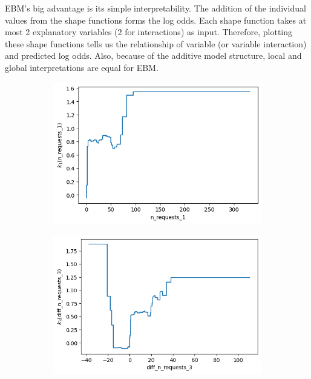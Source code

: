 \documentclass[12pt,titlepage]{article}
\begin{document}
EBM's big advantage is its simple interpretability. The addition of the individual values from the shape functions forms the log odds. Each shape function takes at most 2 explanatory variables (2 for interactions) as input. Therefore, plotting these shape functions tells us the relationship of variable (or variable interaction) and predicted log odds. Also, because of the additive model structure, local and global interpretations are equal for EBM. \\
\begin{figure}[H]
    \centering
        \begin{subfigure}{.55\textwidth}
          \centering
          \includegraphics[width=1\linewidth]{shape_function_n_requests_1.png}
        \end{subfigure}%
        \begin{subfigure}{.55\textwidth}
          \centering
          \includegraphics[width=1\linewidth]{shape_function_diff_n_requests_3.png}

\end{subfigure}
\end{figure}
\end{document}

